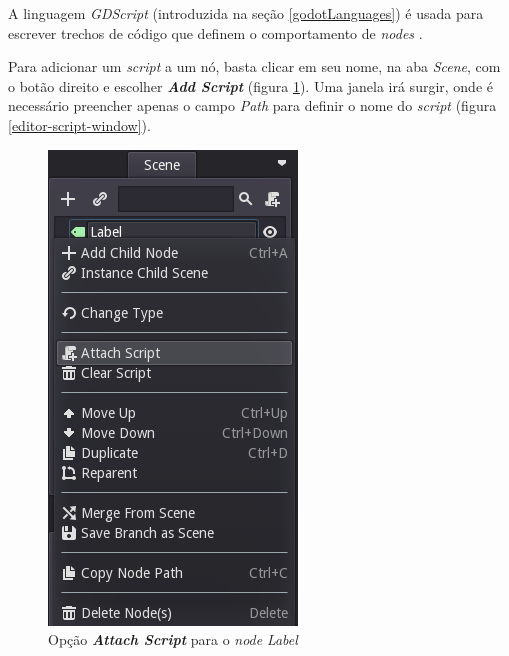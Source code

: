 A linguagem \textit{GDScript} (introduzida na seção \ref{godotLanguages}) é usada para escrever trechos de código que definem o comportamento de \textit{nodes} \citep{godotScripting}.

Para adicionar um \textit{script} a um nó, basta clicar em seu nome, na aba \textit{Scene}, com o botão direito e escolher \textbf{\textit{Add Script}} (figura \ref{editor-attach-script}). Uma janela irá surgir, onde é necessário preencher apenas o campo \textit{Path} para definir o nome do \textit{script} (figura \ref{editor-script-window}).

\begin{figure}[H]
  \centering

  \begin{minipage}{.5\textwidth}
    \centering
    \includegraphics[width=.6\textwidth]{image/editor-attach-script}
    \caption{Opção \textbf{\textit{Attach Script}} para o \textit{node} \textit{Label}}
    \label{editor-attach-script}
  \end{minipage}%
  \begin{minipage}{.5\textwidth}
    \centering

\end{minipage}
\end{figure}

